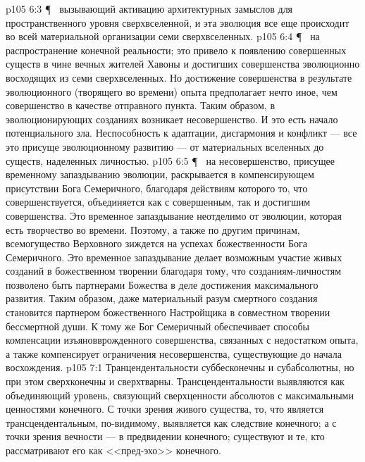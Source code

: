 \vs p105 6:3 \P\ \bibnobreakspace {} вызывающий активацию архитектурных замыслов для пространственного уровня сверхвселенной, и эта эволюция все еще происходит во всей материальной организации семи сверхвселенных.
\vs p105 6:4 \P\ \bibnobreakspace {} на распространение конечной реальности; это привело к появлению совершенных существ в чине вечных жителей Хавоны и достигших совершенства эволюционно восходящих из семи сверхвселенных. Но достижение совершенства в результате эволюционного (творящего во времени) опыта предполагает нечто иное, чем совершенство в качестве отправного пункта. Таким образом, в эволюционирующих созданиях возникает несовершенство. И это есть начало потенциального зла. Неспособность к адаптации, дисгармония и конфликт --- все это присуще эволюционному развитию --- от материальных вселенных до существ, наделенных личностью.
\vs p105 6:5 \P\ \bibnobreakspace {} на несовершенство, присущее временному запаздыванию эволюции, раскрывается в компенсирующем присутствии Бога Семеричного, благодаря действиям которого то, что совершенствуется, объединяется как с совершенным, так и достигшим совершенства. Это временное запаздывание неотделимо от эволюции, которая есть творчество во времени. Поэтому, а также по другим причинам, всемогущество Верховного зиждется на успехах божественности Бога Семеричного. Это временное запаздывание делает возможным участие живых созданий в божественном творении благодаря тому, что созданиям\hyp{}личностям позволено быть партнерами Божества в деле достижения максимального развития. Таким образом, даже материальный разум смертного создания становится партнером божественного Настройщика в совместном творении бессмертной души. К тому же Бог Семеричный обеспечивает способы компенсации изъяновврожденного совершенства, связанных с недостатком опыта, а также компенсирует ограничения несовершенства, существующие до начала восхождения.
\vs p105 7:1 Транцендентальности суббесконечны и субабсолютны, но при этом сверхконечны и сверхтварны. Трансцендентальности выявляются как объединяющий уровень, связующий сверхценности абсолютов с максимальными ценностями конечного. С точки зрения живого существа, то, что является трансцендентальным, по\hyp{}видимому, выявляется как следствие конечного; а с точки зрения вечности --- в предвидении конечного; существуют и те, кто рассматривают его как <<пред\hyp{}эхо>> конечного.
